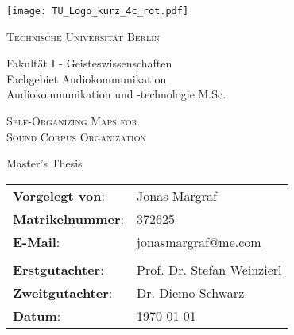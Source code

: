 
\pagestyle{empty}
\begin{otherlanguage}{ngerman}
\begin{titlepage}
  \centering
  \texttt{[image: TU\_Logo\_kurz\_4c\_rot.pdf]}\par\vspace{5mm}
  {\Large\textsc{Technische Universität Berlin}\par\vspace{5mm}}
  Fakultät I - Geisteswissenschaften\\
  Fachgebiet Audiokommunikation\\
  Audiokommunikation und -technologie M.Sc.\\
  \vspace{2cm}
  {\huge\textsc{Self-Organizing Maps for \\Sound Corpus Organization}\par}
  \vspace{2cm}
  {\Large Master's Thesis\par}
  \vspace{2cm}
  \begin{table}[!htb]
    \begin{tabular}{l l}
    \textbf{Vorgelegt von}: & Jonas Margraf \\
    \textbf{Matrikelnummer}: & 372625 \\
    \textbf{E-Mail}: & \href{jonasmargraf@me.com}{jonasmargraf@me.com} \\
    & \\
    \textbf{Erstgutachter}: & Prof. Dr. Stefan Weinzierl \\
    \textbf{Zweitgutachter}: & Dr. Diemo Schwarz \\
    \textbf{Datum}: &\today\\
    \end{tabular}
  \end{table}
\end{titlepage}
\end{otherlanguage}
